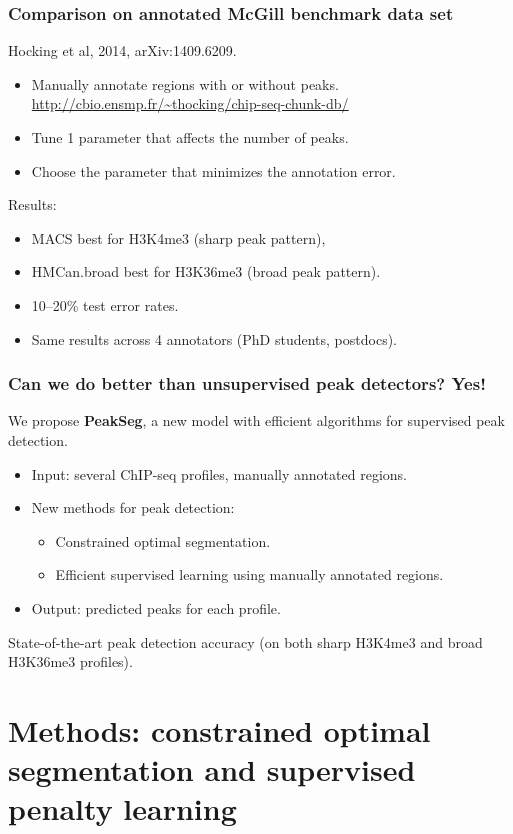 \documentclass{beamer}
\begin{document}
\begin{frame}
  \frametitle{Comparison on annotated McGill benchmark data set}
  Hocking et al, 2014, arXiv:1409.6209.\\
  \begin{itemize}
  \item Manually annotate regions with or without peaks.\\
    \url{http://cbio.ensmp.fr/~thocking/chip-seq-chunk-db/}
  \item Tune 1 parameter that affects the number of peaks.
  \item Choose the parameter that minimizes the annotation error.
  \end{itemize}
  Results:
  \begin{itemize}
  \item MACS best for H3K4me3 (sharp peak pattern),
  \item HMCan.broad best for H3K36me3 (broad peak pattern).
  \item 10--20\% test error rates.
  \item Same results across 4 annotators (PhD students, postdocs).
  \end{itemize}
\end{frame}

\begin{frame}
  \frametitle{Can we do better than unsupervised peak detectors? Yes!}
  We propose \textbf{PeakSeg}, a new model with efficient algorithms
  for supervised peak detection.
  \begin{itemize}
  \item Input: \alert<1>{several ChIP-seq profiles},
    \alert<2>{manually annotated regions}.
  \item New methods for peak detection: 
    \begin{itemize}
    \item \alert<1>{Constrained optimal segmentation}.
    \item Efficient \alert<2>{supervised learning using manually annotated
      regions}.
    \end{itemize}
  \item Output: predicted peaks for each profile.
  \end{itemize}
  State-of-the-art peak detection accuracy (on both sharp H3K4me3 and
  broad H3K36me3 profiles).
\end{frame}

\section{Methods: constrained optimal segmentation and 
  supervised penalty learning}
\end{document}
